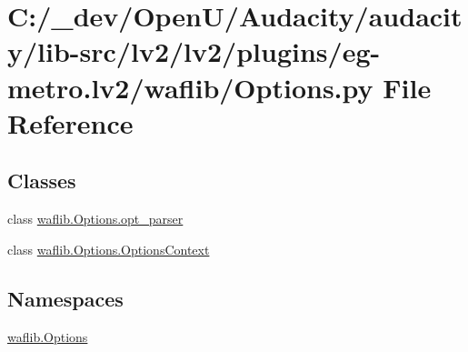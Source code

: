 \hypertarget{lv2_2plugins_2eg-metro_8lv2_2waflib_2_options_8py}{}\section{C\+:/\+\_\+dev/\+Open\+U/\+Audacity/audacity/lib-\/src/lv2/lv2/plugins/eg-\/metro.lv2/waflib/\+Options.py File Reference}
\label{lv2_2plugins_2eg-metro_8lv2_2waflib_2_options_8py}
\subsection*{Classes}
\begin{DoxyCompactItemize}
\item 
class \hyperlink{classwaflib_1_1_options_1_1opt__parser}{waflib.\+Options.\+opt\+\_\+parser}
\item 
class \hyperlink{classwaflib_1_1_options_1_1_options_context}{waflib.\+Options.\+Options\+Context}
\end{DoxyCompactItemize}
\subsection*{Namespaces}
\begin{DoxyCompactItemize}
\item 
 \hyperlink{namespacewaflib_1_1_options}{waflib.\+Options}
\end{DoxyCompactItemize}
